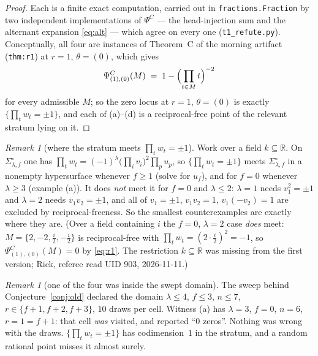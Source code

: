 \documentclass[11pt]{article}
\theoremstyle{definition}
\theoremstyle{remark}
\newtheorem{remark}[theorem]{Remark}
\newcommand{\PsiC}{\Psi^{C}}
\newcommand{\bftheta}{\theta}
\begin{document}
\begin{proof}
Each is a finite exact computation, carried out in \texttt{fractions.Fraction} by two
independent implementations of $\PsiC$ --- the head-injection sum and the alternant
expansion \eqref{eq:alt} --- which agree on every one (\texttt{t1\_refute.py}).
Conceptually, all four are instances of Theorem~C of the morning artifact
(\texttt{thm:r1}) at $r=1$, $\bftheta=(0)$, which gives
\begin{equation}\label{eq:r1}
  \PsiC_{(1),(0)}(M)\;=\;1-\Bigl(\prod_{t\in M}t\Bigr)^{-2}
\end{equation}
for every admissible $M$; so the zero locus at $r=1$, $\bftheta=(0)$ is exactly
$\{\prod_t w_t=\pm1\}$, and each of (a)--(d) is a reciprocal-free point of the relevant
stratum lying on it.
\end{proof}

\begin{remark}[where the stratum meets $\prod_t w_t=\pm1$]\label{rem:meet}
Work over a field $k\subseteq\mathbb{R}$. On $\Sigma^{\circ}_{\lambda,f}$ one has $\prod_t w_t=(-1)^{\lambda}
\bigl(\prod_i v_i\bigr)^{2}\prod_p u_p$, so $\{\prod_t w_t=\pm1\}$ meets
$\Sigma^{\circ}_{\lambda,f}$ in a nonempty hypersurface whenever $f\ge1$ (solve for
$u_f$), and for $f=0$ whenever $\lambda\ge3$ (example (a)). It does \emph{not} meet it
for $f=0$ and $\lambda\le2$: $\lambda=1$ needs $v_1^2=\pm1$ and $\lambda=2$ needs
$v_1v_2=\pm1$, and all of $v_1=\pm1$, $v_1v_2=1$, $v_1(-v_2)=1$ are excluded by
reciprocal-freeness. So the smallest counterexamples are exactly where they are.
(Over a field containing $i$ the $f=0$, $\lambda=2$ case \emph{does} meet:
$M=\{2,-2,\tfrac i2,-\tfrac i2\}$ is reciprocal-free with $\prod_tw_t=(2\cdot\tfrac i2)^2=-1$,
so $\PsiC_{(1),(0)}(M)=0$ by \eqref{eq:r1}. The restriction $k\subseteq\mathbb{R}$ was
missing from the first version; Rick, referee read UID 903, 2026-11-11.)
\end{remark}

\begin{remark}[one of the four was inside the swept domain]
The sweep behind Conjecture~\ref{conj:old} declared the domain $\lambda\le4$, $f\le3$,
$n\le7$, $r\in\{f+1,f+2,f+3\}$, $10$ draws per cell. Witness (a) has
$\lambda=3$, $f=0$, $n=6$, $r=1=f+1$: that cell \emph{was} visited, and reported
``$0$ zeros''. Nothing was wrong with the draws. $\{\prod_tw_t=\pm1\}$ has
codimension~$1$ in the stratum, and a random rational point misses it almost surely.
\end{remark}
\end{document}
